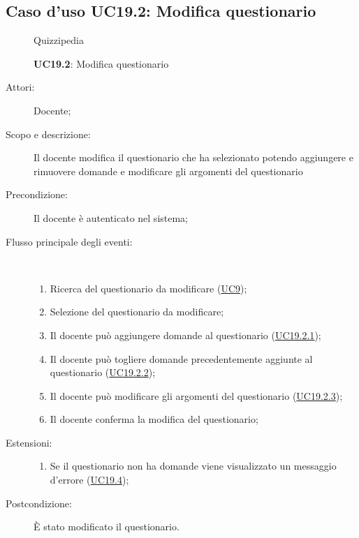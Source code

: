 \subsection{Caso d'uso UC19.2: Modifica questionario}
	\begin{figure}[H]
		\centering
		\begin{resizedtikzpicture}{\textwidth}
		\begin{umlsystem}[x=0, fill=lightgray!20]{Quizzipedia}
		\end{umlsystem}
		\end{resizedtikzpicture}
		\caption{\textbf{UC19.2}: Modifica questionario}
		\label{UC19.2}
	\end{figure}
\begin{description}
\item[Attori:] Docente;
\item[Scopo e descrizione:] Il docente modifica il questionario che ha selezionato potendo aggiungere e rimuovere domande e modificare gli argomenti del questionario
      \item[Precondizione:] Il docente è autenticato nel sistema;

        \item[Flusso principale degli eventi:] \ 
 \begin{enumerate}
          \item Ricerca del questionario da modificare (\hyperlink{UC9}{UC9});
          \item Selezione del questionario da modificare;
          \item Il docente può aggiungere domande al questionario (\hyperlink{UC19.2.1}{UC19.2.1});
          \item Il docente può togliere domande precedentemente aggiunte al questionario (\hyperlink{UC19.2.2}{UC19.2.2});
          \item Il docente può modificare gli argomenti del questionario (\hyperlink{UC19.2.3}{UC19.2.3});
          \item Il docente conferma la modifica del questionario;

      \end{enumerate}
    \item[Estensioni:]
      \begin{enumerate}
          \item Se il questionario non ha domande viene visualizzato un messaggio d'errore (\hyperlink{UC19.4}{UC19.4});

      \end{enumerate}
    \item[Postcondizione:] È stato modificato il questionario.
  \end{description}
\hypertarget{UC19.2.1}{}
